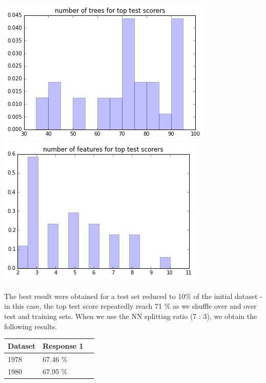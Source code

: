 \documentclass[a0,landscape]{a0poster}
\begin{document}
\begin{multicols}{4}
\begin{center}\vspace{1cm}
  \includegraphics[width=.45\linewidth]{number_forest78.png}
  \includegraphics[width=.45\linewidth]{number_features78.png}
\end{center}\vspace{1cm}

\paragraph{}
The best result were obtained for a test set reduced to 10\% of the initial dataset - in this case, the top test score repeatedly reach 71 \% as we shuffle over and over test and training sets. When we use the NN splitting ratio (7 : 3), we obtain the following results.

\begin{center}\vspace{1cm}
\begin{tabular}{l l l}
\toprule
\textbf{Dataset} & \textbf{Response 1} \\
\midrule
1978 & 67.46 \%  \\
1980 & 67.95 \%  \\
\bottomrule
\end{tabular}
\end{center}\vspace{1cm}



\end{multicols}
\end{document}
